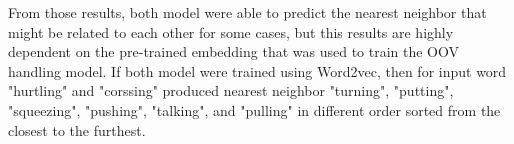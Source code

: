         From those results, both model were able to predict the
        nearest neighbor that might be related to each other for some
        cases, but this results are highly dependent on the pre-trained
        embedding that was used to train the OOV handling model. If both model
        were trained using Word2vec, then for input word "hurtling"
        and "corssing" produced nearest neighbor "turning", "putting",
        "squeezing", "pushing", "talking", and "pulling" in different
        order sorted from the closest to the furthest.
        


